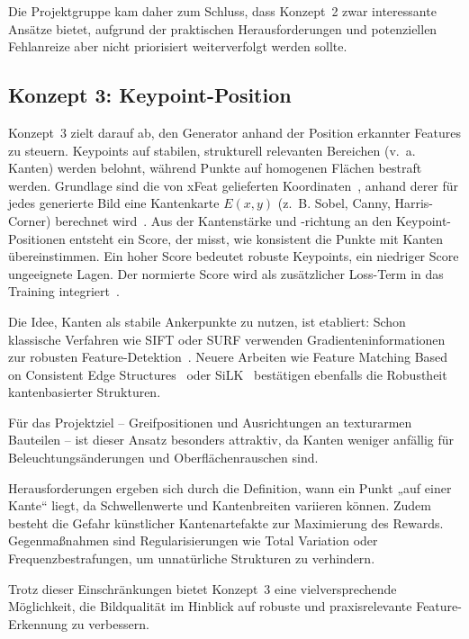 Die Projektgruppe kam daher zum Schluss, dass Konzept~2 zwar interessante Ansätze bietet, aufgrund der praktischen Herausforderungen und potenziellen Fehlanreize aber nicht priorisiert weiterverfolgt werden sollte.

\subsection{Konzept 3: Keypoint-Position}
\label{sec:Konzept3}
Konzept~3 zielt darauf ab, den Generator anhand der Position erkannter Features zu steuern. 
Keypoints auf stabilen, strukturell relevanten Bereichen (v.~a. Kanten) werden belohnt, während Punkte auf homogenen Flächen bestraft werden. 
Grundlage sind die von \ac{xFeat} gelieferten Koordinaten~\cite{potje2024xfeat}, anhand derer für jedes generierte Bild eine Kantenkarte $E(x,y)$ (z.~B. Sobel, Canny, Harris-Corner) berechnet wird~\cite{szeliski2022}. 
Aus der Kantenstärke und -richtung an den Keypoint-Positionen entsteht ein Score, der misst, wie konsistent die Punkte mit Kanten übereinstimmen. 
Ein hoher Score bedeutet robuste Keypoints, ein niedriger Score ungeeignete Lagen. 
Der normierte Score wird als zusätzlicher Loss-Term in das Training integriert~\cite{chaumette2006visual,chaumette2007visual}.  

Die Idee, Kanten als stabile Ankerpunkte zu nutzen, ist etabliert: 
Schon klassische Verfahren wie \ac{SIFT} oder \ac{SURF} verwenden Gradienteninformationen zur robusten Feature-Detektion~\cite{lowe2004distinctive,bay2006surf}. 
Neuere Arbeiten wie Feature Matching Based on Consistent Edge Structures~\cite{mdpi2020edge} oder SiLK~\cite{gleize2023silk} bestätigen ebenfalls die Robustheit kantenbasierter Strukturen.  

Für das Projektziel – Greifpositionen und Ausrichtungen an texturarmen Bauteilen – ist dieser Ansatz besonders attraktiv, da Kanten weniger anfällig für Beleuchtungsänderungen und Oberflächenrauschen sind.  

Herausforderungen ergeben sich durch die Definition, wann ein Punkt „auf einer Kante“ liegt, da Schwellenwerte und Kantenbreiten variieren können. 
Zudem besteht die Gefahr künstlicher Kantenartefakte zur Maximierung des Rewards. 
Gegenmaßnahmen sind Regularisierungen wie Total Variation oder Frequenzbestrafungen, um unnatürliche Strukturen zu verhindern.  

Trotz dieser Einschränkungen bietet Konzept~3 eine vielversprechende Möglichkeit, die Bildqualität im Hinblick auf robuste und praxisrelevante Feature-Erkennung zu verbessern.
